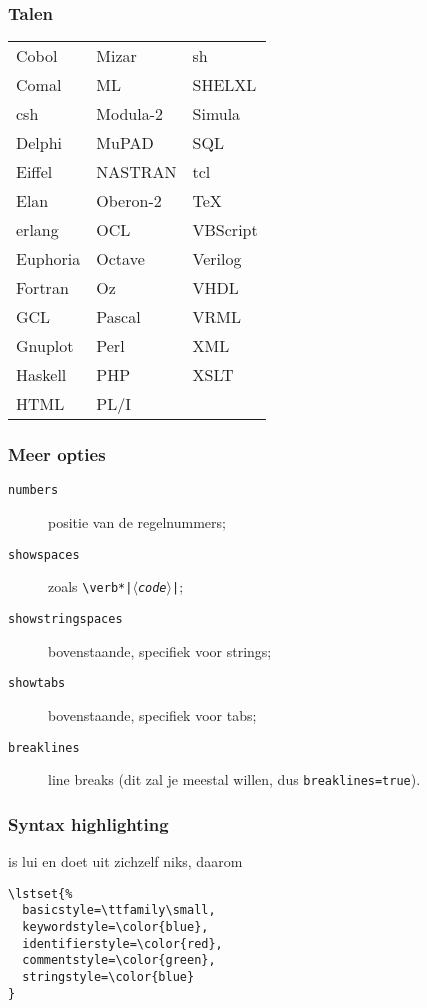 \begin{frame}
  \frametitle{Talen}

  \small
  \begin{tabular}{lll}
    Cobol & Mizar & sh          \\
    Comal & ML & SHELXL         \\
    csh & Modula-2 & Simula     \\
    Delphi & MuPAD & SQL        \\
    Eiffel & NASTRAN & tcl      \\
    Elan & Oberon-2 & TeX       \\
    erlang & OCL & VBScript     \\
    Euphoria & Octave & Verilog \\
    Fortran & Oz & VHDL         \\
    GCL & Pascal & VRML         \\
    Gnuplot & Perl & XML        \\
    Haskell & PHP & XSLT        \\
    HTML & PL/I
  \end{tabular}
\end{frame}

\begin{frame}[fragile]
  \frametitle{Meer opties}

  \begin{description}
    \item[\texttt{numbers}] positie van de regelnummers;
    \item[\texttt{showspaces}] zoals \texttt{\textcolor{uagreen}{\textbackslash verb}*|$\langle$\textsl{code}$\rangle$|};
    \item[\texttt{showstringspaces}] bovenstaande, specifiek voor strings;
    \item[\texttt{showtabs}] bovenstaande, specifiek voor tabs;
    \item[\texttt{breaklines}] line breaks (dit zal je meestal willen, dus \verb|breaklines=true|).
  \end{description}
\end{frame}

\begin{frame}[fragile]
  \frametitle{Syntax highlighting}

   is lui en doet uit zichzelf niks, daarom
  \begin{verbatim}
\lstset{%
  basicstyle=\ttfamily\small,
  keywordstyle=\color{blue},
  identifierstyle=\color{red},
  commentstyle=\color{green},
  stringstyle=\color{blue}
}
\end{verbatim}
\end{frame}


